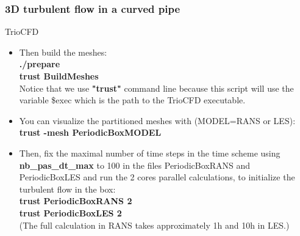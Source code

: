 \documentclass[10pt, hyperref={unicode=true,pdfusetitle, bookmarks=true,bookmarksnumbered=false,bookmarksopen=false, breaklinks=false,pdfborder={0 0 1},backref=true,colorlinks=true,linkcolor=darkblue,pageanchor}]{beamer}
\begin{document}
\begin{frame}
\frametitle{3D turbulent flow in a curved pipe}
\begin{block}{TrioCFD}

\begin{itemize}
\item Then build the meshes:\\
\textbf{./prepare} \\
\textbf{trust BuildMeshes} \\
Notice that we use \textbf{"trust"} command line because this script will use the variable \$exec which is the path to the TrioCFD executable.

\item You can visualize the partitioned meshes with (MODEL=RANS or LES): \\
\textbf{trust -mesh PeriodicBoxMODEL}

\item Then, fix the maximal number of time steps in the time scheme using \textbf{nb\_pas\_dt\_max} to 100 in the files PeriodicBoxRANS and PeriodicBoxLES and run the 2 cores parallel calculations, to initialize the turbulent flow in the box: \\
\textbf{trust PeriodicBoxRANS 2} \\
\textbf{trust PeriodicBoxLES 2} \\
(The full calculation in RANS takes approximately 1h and 10h in LES.)
\end{itemize}

\end{block}
\end{frame}
\end{document}
